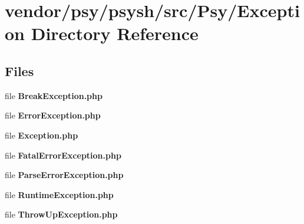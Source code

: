 \section{vendor/psy/psysh/src/\+Psy/\+Exception Directory Reference}
\label{dir_bd648bb5d564136b5194b7f09a3dfdf7}
\subsection*{Files}
\begin{DoxyCompactItemize}
\item 
file {\bf Break\+Exception.\+php}
\item 
file {\bf Error\+Exception.\+php}
\item 
file {\bf Exception.\+php}
\item 
file {\bf Fatal\+Error\+Exception.\+php}
\item 
file {\bf Parse\+Error\+Exception.\+php}
\item 
file {\bf Runtime\+Exception.\+php}
\item 
file {\bf Throw\+Up\+Exception.\+php}
\end{DoxyCompactItemize}
